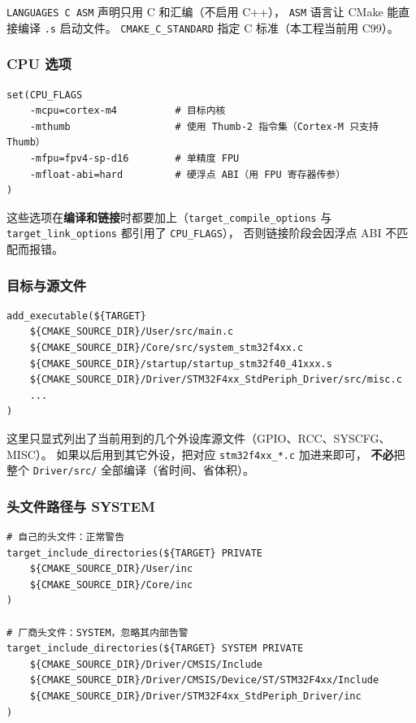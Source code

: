 \texttt{LANGUAGES C ASM} 声明只用 C 和汇编（不启用 C++），
\texttt{ASM} 语言让 CMake 能直接编译 \texttt{.s} 启动文件。
\texttt{CMAKE\_C\_STANDARD} 指定 C 标准（本工程当前用 C99）。

\subsubsection{CPU 选项}

\begin{lstlisting}[style=generic]
set(CPU_FLAGS
    -mcpu=cortex-m4          # 目标内核
    -mthumb                  # 使用 Thumb-2 指令集（Cortex-M 只支持 Thumb）
    -mfpu=fpv4-sp-d16        # 单精度 FPU
    -mfloat-abi=hard         # 硬浮点 ABI（用 FPU 寄存器传参）
)
\end{lstlisting}

这些选项在\textbf{编译和链接}时都要加上（\texttt{target\_compile\_options} 与
\texttt{target\_link\_options} 都引用了 \texttt{CPU\_FLAGS}），
否则链接阶段会因浮点 ABI 不匹配而报错。

\subsubsection{目标与源文件}

\begin{lstlisting}[style=generic]
add_executable(${TARGET}
    ${CMAKE_SOURCE_DIR}/User/src/main.c
    ${CMAKE_SOURCE_DIR}/Core/src/system_stm32f4xx.c
    ${CMAKE_SOURCE_DIR}/startup/startup_stm32f40_41xxx.s
    ${CMAKE_SOURCE_DIR}/Driver/STM32F4xx_StdPeriph_Driver/src/misc.c
    ...
)
\end{lstlisting}

这里只显式列出了当前用到的几个外设库源文件（GPIO、RCC、SYSCFG、MISC）。
如果以后用到其它外设，把对应 \texttt{stm32f4xx\_*.c} 加进来即可，
\textbf{不必}把整个 \texttt{Driver/src/} 全部编译（省时间、省体积）。

\subsubsection{头文件路径与 SYSTEM}

\begin{lstlisting}[style=generic]
# 自己的头文件：正常警告
target_include_directories(${TARGET} PRIVATE
    ${CMAKE_SOURCE_DIR}/User/inc
    ${CMAKE_SOURCE_DIR}/Core/inc
)

# 厂商头文件：SYSTEM，忽略其内部告警
target_include_directories(${TARGET} SYSTEM PRIVATE
    ${CMAKE_SOURCE_DIR}/Driver/CMSIS/Include
    ${CMAKE_SOURCE_DIR}/Driver/CMSIS/Device/ST/STM32F4xx/Include
    ${CMAKE_SOURCE_DIR}/Driver/STM32F4xx_StdPeriph_Driver/inc
)
\end{lstlisting}

